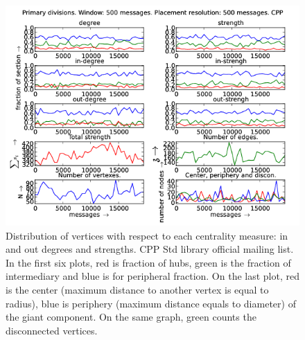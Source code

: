 \documentclass[%
 aip,
 jmp,%
 amsmath,amssymb,
 reprint,%
]{revtex4-1}
\begin{document}
\begin{figure}[hbtp] 
   \centering
        \includegraphics[width=\textwidth]{figs/CPP/500}
    \caption{Distribution of vertices with respect to each centrality measure: in and out degrees and strengths. CPP Std library official mailing list. In the first six plots, red is fraction of hubs, green is the fraction of intermediary and blue is for peripheral fraction. On the last plot, red is the center (maximum distance to another vertex is equal to radius), blue is periphery (maximum distance equals to diameter) of the giant component. On the same graph, green counts the disconnected vertices.}
    \label{fig:cpp500}
\end{figure}
\end{document}
